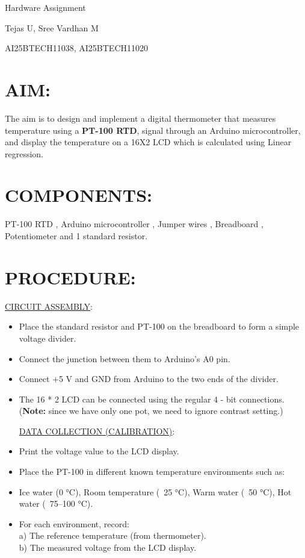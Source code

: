 \documentclass{article}
\begin{document}
\begin{center}
    \Huge{Hardware Assignment}
\end{center}
\begin{center}
    \Large{Tejas U, Sree Vardhan M}
\end{center}

\begin{center}
    \Large{AI25BTECH11038, AI25BTECH11020}
\end{center}

\section{AIM:}
The aim is to design and implement a digital thermometer that measures temperature using a \textbf{PT-100 RTD}, signal through an Arduino microcontroller, and display the temperature on a 16X2 LCD which is calculated using Linear regression.

\section{COMPONENTS:}
PT-100 RTD , Arduino microcontroller , Jumper wires , Breadboard , Potentiometer and 1 standard resistor.

\section{PROCEDURE:}
\underline{CIRCUIT ASSEMBLY}:
\begin{itemize}
    \item Place the standard resistor and PT-100 on the breadboard to form a simple voltage divider.
    \item Connect the junction between them to Arduino’s A0 pin.
    \item Connect +5 V and GND from Arduino to the two ends of the divider.
    \item The 16 * 2 LCD can be connected using the regular 4 - bit connections. 
    (\textbf{Note:} since we have only one pot, we need to ignore contrast setting.)

\underline{DATA COLLECTION (CALIBRATION)}:
    \item Print the voltage value to the LCD display.
    \item Place the PT-100 in different known temperature environments such as:
    \item Ice water (0 °C), Room temperature (~25 °C), Warm water (~50 °C), Hot water (~75–100 °C).
    \item For each environment, record:\\
    a) The reference temperature (from thermometer).\\
    b) The measured voltage from the LCD display.
\end{itemize}
\end{document}
